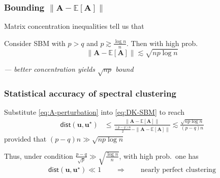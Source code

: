\documentclass[compress,
mathserif,wide,%
]{beamer}
\begin{document}
\begin{frame}
\frametitle{Bounding $\| \bm{A}-\mathbb{E}[\bm{A}] \|$}

Matrix concentration inequalities tell us that 
%
\begin{lemma}
\label{lem:perturbation-SBM}
%
Consider SBM with $p>q$ and $p\gtrsim \frac{\log n}{n}$. Then with high prob. 
%
\begin{equation}
	\label{eq:A-perturbation}
	\|\bm{A}-\mathbb{E}[\bm{A}]\|\lesssim \sqrt{np \log n} 
\end{equation}
%
\end{lemma}

{\hfill \em --- better concentration yields $\sqrt{np}$ bound}
\end{frame}



\begin{frame}
\frametitle{Statistical accuracy of spectral clustering}

Substitute \eqref{eq:A-perturbation} into \eqref{eq:DK-SBM} to reach
%
\begin{align*}
	\mathsf{dist}( {\bm{u}}, \bm{u}^{\star}) &\leq \frac{\|\bm{A}-\mathbb{E}[\bm{A}]\|}{\frac{(p-q)n}{2}-\|\bm{A}-\mathbb{E}[\bm{A}]\|}  \lesssim \frac{\sqrt{np \log n}}{(p-q)n}
\end{align*}
%
provided that $(p-q)n \gg \sqrt{np \log n}$

\bigskip

Thus, under condition \alert{$\frac{p-q}{\sqrt{p}}\gg \sqrt{\tfrac{\log n}{n}} $}, with high prob.~one has
%
\begin{align*}
	\mathsf{dist}( {\bm{u}}, \bm{u}^{\star}) \ll 1  \qquad \Longrightarrow \qquad  \text{nearly perfect clustering}
\end{align*}
%


\end{frame}
\end{document}
